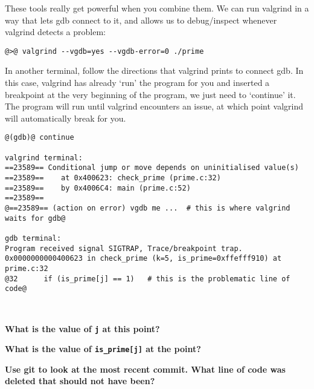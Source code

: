 \documentclass{article}
\begin{document}
These tools really get powerful when you combine them. We can run valgrind in
a way that lets gdb connect to it, and allows us to debug/inspect whenever
valgrind detects a problem:
\begin{lstlisting}
@>@ valgrind --vgdb=yes --vgdb-error=0 ./prime
\end{lstlisting}
In another terminal, follow the directions that valgrind prints to connect
gdb. In this case, valgrind has already `run' the program for you and inserted
a breakpoint at the very beginning of the program, we just need to `continue'
it. The program will run until valgrind encounters an issue, at which point
valgrind will automatically break for you.
\begin{lstlisting}
@(gdb)@ continue

valgrind terminal:
==23589== Conditional jump or move depends on uninitialised value(s)
==23589==    at 0x400623: check_prime (prime.c:32)
==23589==    by 0x4006C4: main (prime.c:52)
==23589== 
@==23589== (action on error) vgdb me ...  # this is where valgrind waits for gdb@

gdb terminal:
Program received signal SIGTRAP, Trace/breakpoint trap.
0x0000000000400623 in check_prime (k=5, is_prime=0xffefff910) at prime.c:32
@32      if (is_prime[j] == 1)   # this is the problematic line of code@
\end{lstlisting}

~

\textbf{What is the value of \texttt{j} at this point?}\\
\vspace{1cm}

\textbf{What is the value of \texttt{is\_prime[j]} at the point?}\\
\vspace{1cm}

\textbf{Use git to look at the most recent commit. What line of code was
  deleted that should not have been?}
\end{document}
